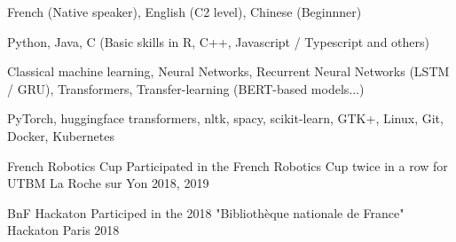 \documentclass[11pt, a4paper]{awesome-cv}
\begin{document}

\begin{cvskills}
  {French (Native speaker), English (C2 level), Chinese (Beginnner)}
  
  {Python, Java, C (Basic skills in R, C++, Javascript / Typescript and others)}

  {Classical machine learning, Neural Networks, Recurrent Neural Networks (LSTM / GRU), Transformers, Transfer-learning (BERT-based models...)}

  {PyTorch, huggingface transformers, nltk, spacy, scikit-learn, GTK+, Linux, Git, Docker, Kubernetes}
\end{cvskills}



\begin{cvhonors}
  \cvhonor
  {French Robotics Cup}
  {Participated in the French Robotics Cup twice in a row for UTBM}
  {La Roche sur Yon}
  {2018, 2019}

  \cvhonor
  {BnF Hackaton}
  {Participed in the 2018 "Bibliothèque nationale de France" Hackaton}
  {Paris}
  {2018}
\end{cvhonors}


\end{document}

